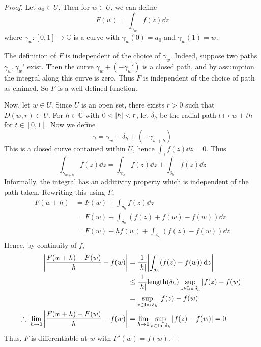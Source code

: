 \begin{proof}
	Let \( a_0 \in U \).
	Then for \( w \in U \), we can define
	\[
		F(w) = \int_{\gamma_w} f(z) \dd{z}
	\]
	where \( \gamma_w \colon [0,1] \to \mathbb C \) is a curve with \( \gamma_w(0) = a_0 \) and \( \gamma_w(1) = w \).

	The definition of \( F \) is independent of the choice of \( \gamma_w \).
	Indeed, suppose two paths \( \gamma_w, \gamma_w' \) exist.
	Then the curve \( \gamma_w + (-\gamma_w') \) is a closed path, and by assumption the integral along this curve is zero.
	Thus \( F \) is independent of the choice of path as claimed.
	So \( F \) is a well-defined function.

	Now, let \( w \in U \).
	Since \( U \) is an open set, there exists \( r > 0 \) such that \( D(w,r) \subset U \).
	For \( h \in \mathbb C \) with \( 0 < \abs{h} < r \), let \( \delta_h \) be the radial path \( t \mapsto w + th \) for \( t \in [0,1] \).
	Now we define
	\[
		\gamma = \gamma_w + \delta_h + (-\gamma_{w+h})
	\]
	This is a closed curve contained within \( U \), hence \( \int_\gamma f(z) \dd{z} = 0 \).
	Thus
	\[
		\int_{\gamma_{w+h}} f(z) \dd{z} = \int_{\gamma_w} f(z) \dd{z} + \int_{\delta_h} f(z) \dd{z}
	\]
	Informally, the integral has an additivity property which is independent of the path taken.
	Rewriting this using \( F \),
	\begin{align*}
		F(w+h) & = F(w) + \int_{\delta_h} f(z) \dd{z}                  \\
		       & = F(w) + \int_{\delta_h} (f(z) + f(w) - f(w)) \dd{z}  \\
		       & = F(w) + hf(w) + \int_{\delta_h} (f(z) - f(w)) \dd{z}
	\end{align*}
	Hence, by continuity of \( f \),
	\begin{align*}
		\abs{\frac{F(w+h) - F(w)}{h} - f(w)}                           & = \frac{1}{\abs{h}} \abs{\int_{\delta_h} (f(z) - f(w)) \dd{z}}                               \\
		                                                               & \leq \frac{1}{\abs{h}} \mathrm{length}(\delta_h) \sup_{z \in \operatorname{Im} \delta_h} \abs{f(z) - f(w)} \\
		                                                               & = \sup_{z \in \operatorname{Im} \delta_h} \abs{f(z) - f(w)}                                                \\
		\therefore\ \lim_{h \to 0} \abs{\frac{F(w+h) - F(w)}{h} - f(w)} & = \lim_{h \to 0} \sup_{z \in \operatorname{Im} \delta_h} \abs{f(z) - f(w)} = 0
	\end{align*}
	Thus, \( F \) is differentiable at \( w \) with \( F'(w) = f(w) \).
\end{proof}

